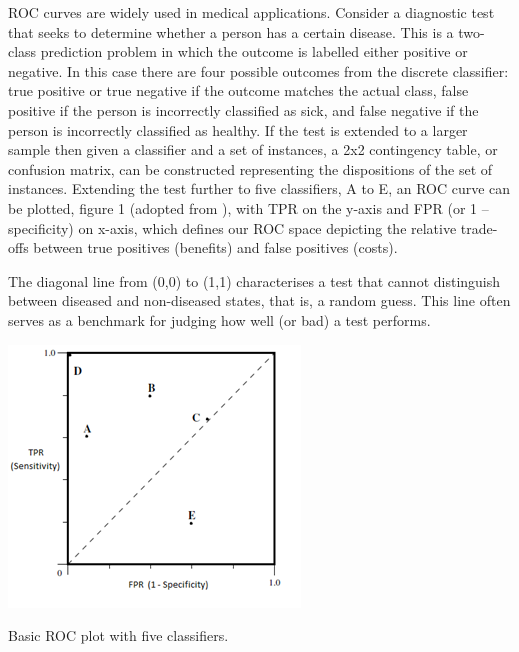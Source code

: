 \documentclass[a4paper,justified]{tufte-handout}
\begin{document}
\begin{fullwidth}
\vspace{3mm}
\noindent ROC curves are widely used in medical applications. Consider a diagnostic test that seeks to determine whether a person has a certain disease. This is a two-class prediction problem in which the outcome is labelled either positive or negative. In this case there are four possible outcomes from the discrete classifier: true positive or true negative if the outcome matches the actual class, false positive if the person is incorrectly classified as sick, and false negative if the person is incorrectly classified as healthy. If the test is extended to a larger sample then given a classifier and a set of instances, a 2x2 contingency table, or confusion matrix, can be constructed representing the dispositions of the set of instances. Extending the test further to five classifiers, A to E, an ROC curve can be plotted, figure 1 (adopted from \citep{fawcett2006introroc}), with TPR on the y-axis and FPR (or 1 – specificity) on x-axis, which defines our ROC space depicting the relative trade-offs between true positives (benefits) and false positives (costs). 
\end{fullwidth}

\vspace{3mm}
\noindent The diagonal line from (0,0) to (1,1) characterises a test that cannot distinguish between diseased and non-diseased states, that is, a random guess. This line often serves as a benchmark for judging how well (or bad) a test performs.

\begin{marginfigure}[1.5cm]
	\includegraphics[width=\linewidth]{roc_curves/Figure1.png}
	\caption{Basic ROC plot with five classifiers.}
\end{marginfigure}
\end{document}
